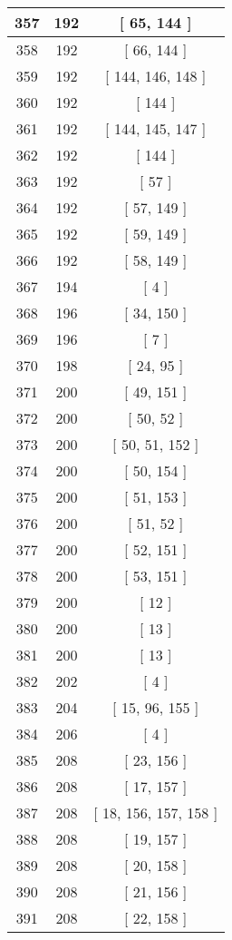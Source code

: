 \begin{center}
\begin{longtable}[H]{|| c c c ||}
\hline
357 & 192 & [ 65, 144 ] \\ 
\hline
358 & 192 & [ 66, 144 ] \\ 
\hline
359 & 192 & [ 144, 146, 148 ] \\ 
\hline
360 & 192 & [ 144 ] \\ 
\hline
361 & 192 & [ 144, 145, 147 ] \\ 
\hline
362 & 192 & [ 144 ] \\ 
\hline
363 & 192 & [ 57 ] \\ 
\hline
364 & 192 & [ 57, 149 ] \\ 
\hline
365 & 192 & [ 59, 149 ] \\ 
\hline
366 & 192 & [ 58, 149 ] \\ 
\hline
367 & 194 & [ 4 ] \\ 
\hline
368 & 196 & [ 34, 150 ] \\ 
\hline
369 & 196 & [ 7 ] \\ 
\hline
370 & 198 & [ 24, 95 ] \\ 
\hline
371 & 200 & [ 49, 151 ] \\ 
\hline
372 & 200 & [ 50, 52 ] \\ 
\hline
373 & 200 & [ 50, 51, 152 ] \\ 
\hline
374 & 200 & [ 50, 154 ] \\ 
\hline
375 & 200 & [ 51, 153 ] \\ 
\hline
376 & 200 & [ 51, 52 ] \\ 
\hline
377 & 200 & [ 52, 151 ] \\ 
\hline
378 & 200 & [ 53, 151 ] \\ 
\hline
379 & 200 & [ 12 ] \\ 
\hline
380 & 200 & [ 13 ] \\ 
\hline
381 & 200 & [ 13 ] \\ 
\hline
382 & 202 & [ 4 ] \\ 
\hline
383 & 204 & [ 15, 96, 155 ] \\ 
\hline
384 & 206 & [ 4 ] \\ 
\hline
385 & 208 & [ 23, 156 ] \\ 
\hline
386 & 208 & [ 17, 157 ] \\ 
\hline
387 & 208 & [ 18, 156, 157, 158 ] \\ 
\hline
388 & 208 & [ 19, 157 ] \\ 
\hline
389 & 208 & [ 20, 158 ] \\ 
\hline
390 & 208 & [ 21, 156 ] \\ 
\hline
391 & 208 & [ 22, 158 ] \\ 

\end{longtable}
\end{center}
